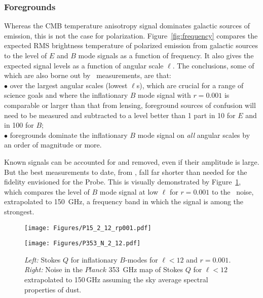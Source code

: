 \subsubsection{Foregrounds}
\label{sec:foregrounds}

\vspace{-0.05in}


Whereas the CMB temperature anisotropy signal dominates galactic sources
of emission, this is not the case for polarization. 
Figure~\ref{fig:frequency} compares the expected RMS brightness temperature 
of polarized emission from galactic sources to the level of $E$ and $B$ mode signals
as a function of frequency. It also gives the expected signal levels as a function of angular scale $\ell$.  
The conclusions, some of which are also borne out by \planck\ measurements, are that: \\
$\bullet$ over the largest angular scales (lowest $\ell$s), which are crucial for a range 
of science goals and where the inflationary $B$ mode 
signal with $r =0.001$ is comparable or larger than that from lensing, foreground sources of confusion 
will need to be measured and subtracted to a level better than 1 part in 10 for $E$ and in 100 for $B$; \\
$\bullet$ foregrounds dominate the inflationary $B$ mode signal on {\it all} angular scales by 
an order of magnitude or more.

Known signals can be accounted for and removed, even if their amplitude is large. 
But the best measurements to date, from \planck , fall far shorter than needed for the fidelity 
envisioned for the Probe. This is visually demonstrated by Figure~\ref{fig:Qrp001}, which 
compares the level of $B$ mode signal at low $\ell$ for $r = 0.001$ to the \planck\ noise, 
extrapolated to 150~GHz, a frequency band in which the signal is among the strongest. 
\begin{figure}[ht!]
\parbox{2.in}{\centerline {
\texttt{[image: Figures/P15\_2\_12\_rp001.pdf]} } }
\hspace{-.05in}
\parbox{2.0in}{\centerline { 
\texttt{[image: Figures/P353\_N\_2\_12.pdf]} } }
\hspace{0.in}
\parbox{2.4in} { 
\caption{ \footnotesize \setlength{\baselineskip}{0.95\baselineskip}
{\it Left:} Stokes $Q$ for inflationary $B$-modes for $\ell<12$ and $r=0.001$. 
 {\it Right:} Noise in the $Planck$ 353~GHz map of Stokes $Q$ for $\ell<12$ 
 extrapolated to 150\,GHz assuming the sky average spectral properties of dust. 
\label{fig:Qrp001}  }  }
\vspace{-0.05in}
\end{figure}

